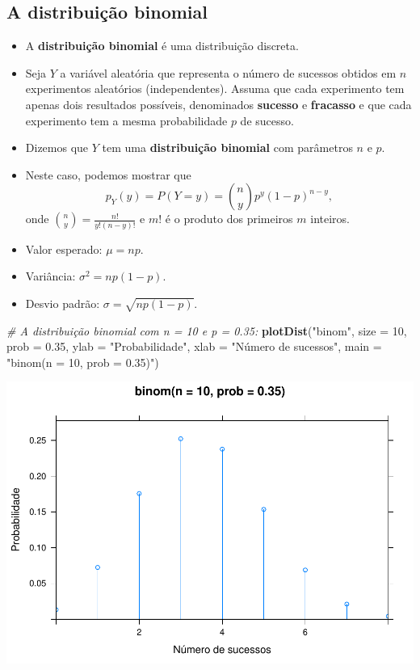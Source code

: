 \documentclass[]{article}
\newenvironment{Shaded}{\begin{snugshade}}{\end{snugshade}}
\newcommand{\KeywordTok}[1]{\textcolor[rgb]{0.13,0.29,0.53}{\textbf{#1}}}
\newcommand{\DataTypeTok}[1]{\textcolor[rgb]{0.13,0.29,0.53}{#1}}
\newcommand{\DecValTok}[1]{\textcolor[rgb]{0.00,0.00,0.81}{#1}}
\newcommand{\FloatTok}[1]{\textcolor[rgb]{0.00,0.00,0.81}{#1}}
\newcommand{\StringTok}[1]{\textcolor[rgb]{0.31,0.60,0.02}{#1}}
\newcommand{\CommentTok}[1]{\textcolor[rgb]{0.56,0.35,0.01}{\textit{#1}}}
\newcommand{\NormalTok}[1]{#1}
\providecommand{\tightlist}{%
  \setlength{\itemsep}{0pt}\setlength{\parskip}{0pt}}
\begin{document}
\subsection{A distribuição binomial}\label{a-distribuicao-binomial}

\begin{itemize}
\tightlist
\item
  A \textbf{distribuição binomial} é uma distribuição discreta.
\item
  Seja \(Y\) a variável aleatória que representa o número de sucessos
  obtidos em \(n\) experimentos aleatórios (independentes). Assuma que
  cada experimento tem apenas dois resultados possíveis, denominados
  \textbf{sucesso} e \textbf{fracasso} e que cada experimento tem a
  mesma probabilidade \(p\) de sucesso.
\item
  Dizemos que \(Y\) tem uma \textbf{distribuição binomial} com
  parâmetros \(n\) e \(p\).\\
\item
  Neste caso, podemos mostrar que
  \[p_Y(y) = P(Y = y) = \binom{n}{y} p^y (1-p)^{n-y},\] onde
  \(\binom{n}{y}=\frac{n!}{y!(n-y)!}\) e \(m!\) é o produto dos
  primeiros \(m\) inteiros.
\item
  Valor esperado: \(\mu = n p\).
\item
  Variância: \(\sigma^2 = n p (1-p)\).
\item
  Desvio padrão: \(\sigma = \sqrt{n p (1-p)}\).
\end{itemize}

\begin{Shaded}
\begin{Highlighting}[]
\CommentTok{# A distribuição binomial com n = 10 e p = 0.35:}
\KeywordTok{plotDist}\NormalTok{(}\StringTok{"binom"}\NormalTok{, }\DataTypeTok{size =} \DecValTok{10}\NormalTok{, }\DataTypeTok{prob =} \FloatTok{0.35}\NormalTok{,}
         \DataTypeTok{ylab =} \StringTok{"Probabilidade"}\NormalTok{, }\DataTypeTok{xlab =} \StringTok{"Número de sucessos"}\NormalTok{, }\DataTypeTok{main =} \StringTok{"binom(n = 10, prob = 0.35)"}\NormalTok{)}
\end{Highlighting}
\end{Shaded}

\includegraphics{probability_files/figure-latex/dbinom-1.pdf}
\end{document}
